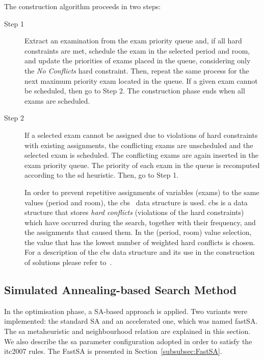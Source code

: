 The construction algorithm proceeds in two steps:
\begin{description}
	\item[Step 1] Extract an examination from the exam priority queue and, if all hard constraints are met, schedule the exam in the selected period and room, and update the priorities of exams placed in the queue, considering only the \textit{No Conflicts} hard constraint. Then, repeat the same process for the next maximum priority exam located in the queue. If a given exam cannot be scheduled, then go to Step 2. The construction phase ends when all exams are scheduled. 
	
	\item[Step 2] If a selected exam cannot be assigned due to violations of hard constraints with existing assignments, the conflicting exams are unscheduled and the selected exam is scheduled. The conflicting exams are again inserted in the exam priority queue. The priority of each exam in the queue is recomputed according to the \gls{sd} heuristic. Then, go to Step 1. 
	
	In order to prevent repetitive assignments of variables (exams) to the same values (period and room), the \gls{cbs}~\citep{Muller2009} data structure is used. \gls{cbs} is a data structure that stores \textit{hard conflicts} (violations of the hard constraints) which have occurred during the search, together with their frequency, and the assignments that caused them. In the (period, room) value selection, the value that has the lowest number of weighted hard conflicts is chosen. For a description of the \gls{cbs} data structure and its use in the construction of solutions please refer to~\citep{Muller2016}.
\end{description}



\subsection{Simulated Annealing-based Search Method}
\label{subsec:SABasedSearchMethod}

In the optimisation phase, a SA-based approach is applied. Two variants were implemented: the standard SA and an accelerated one, which was named \gls{fastSA}. The \gls{sa} metaheuristic and neighbourhood relation are explained in this section. We also describe the \gls{sa} parameter configuration adopted in order to satisfy the \gls{itc2007} rules. The FastSA is presented in Section~\ref{subsubsec:FastSA}.


